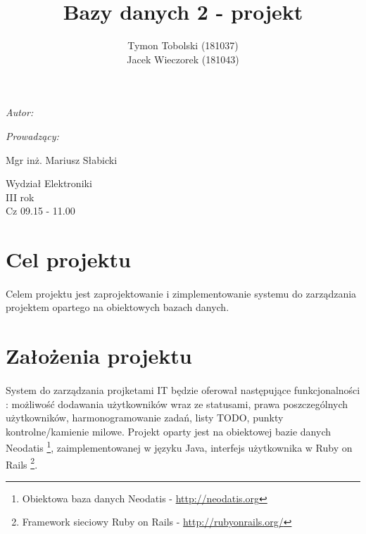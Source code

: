 \documentclass[wide,a4paper,titlepage,12pt] {article}
\title{Bazy danych 2 - projekt}
\author{Tymon Tobolski (181037)\\ Jacek Wieczorek (181043)}
\makeatletter
\renewcommand{\maketitle}{
\begin{titlepage}
  \begin{center}
    \vspace*{3cm}
    \LARGE \@title \par
    \vspace{2cm}
    \textit{\small Autor:}\par
    \normalsize \@author\par \normalsize
    \vspace{3cm}
    \textit{\small Prowadzący:}\par
    Mgr inż. Mariusz Słabicki \par
    \vspace{2cm}
    Wydział Elektroniki\\ III rok\\ Cz 09.15 - 11.00\par
    \vspace{4cm}
    \small \@date
  \end{center}
\end{titlepage}
}
\makeatother
\begin{document}
\maketitle
  
\section{Cel projektu}
\paragraph{}
Celem projektu jest zaprojektowanie i zimplementowanie systemu do zarządzania projektem opartego na obiektowych bazach danych.

\section{Założenia projektu}
\paragraph{}
System do zarządzania projketami IT będzie oferował następujące funkcjonalności : możliwość dodawania użytkowników wraz ze statusami, prawa poszczególnych użytkowników, harmonogramowanie zadań, listy TODO, punkty kontrolne/kamienie milowe. Projekt oparty jest na obiektowej bazie danych Neodatis \footnote{Obiektowa baza danych Neodatis - \url{http://neodatis.org}}, zaimplementowanej w języku Java, interfejs użytkownika w Ruby on Rails \footnote{Framework sieciowy Ruby on Rails - \url{http://rubyonrails.org/}}. 
\end{document}
